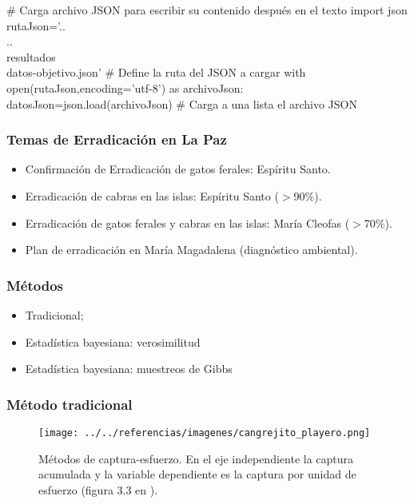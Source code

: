 \begin{pycode}
#  Carga archivo JSON para escribir su contenido después en el texto
import json
rutaJson='..\\..\\resultados\\datos-objetivo.json' # Define la ruta del JSON a cargar
with open(rutaJson,encoding='utf-8') as archivoJson:
      datosJson=json.load(archivoJson)  # Carga a una lista el archivo JSON
\end{pycode}
\begin{frame} %
\frametitle{Temas de Erradicaci\'on en La Paz} %
\begin{itemize} %
  \item Confirmaci\'on de Erradicaci\'on de gatos ferales: Esp\'iritu Santo. %
  \item Erradicaci\'on de cabras en las islas: Esp\'iritu Santo ($>$90\%).
  \item Erradicaci\'on de gatos ferales y cabras en las islas: Mar\'ia Cleofas
  ($>$70\%).
  \item Plan de erradicaci\'on en Mar\'ia Magadalena (diagn\'ostico ambiental).
\end{itemize}%
\end{frame} %
\begin{frame}
\frametitle{M\'etodos}
\begin{itemize}
  \item Tradicional; \pause %
  \item Estad\'istica bayesiana: verosimilitud \pause
  \item Estad\'istica bayesiana: muestreos de Gibbs\pause
\end{itemize}
\end{frame}
\begin{frame}
\frametitle{M\'etodo tradicional}
\begin{figure}[h] %
\centering %
\texttt{[image: ../../referencias/imagenes/cangrejito\_playero.png]} %
\caption{M\'etodos de captura-esfuerzo. En el eje
independiente la captura acumulada y la variable dependiente es la captura por
unidad de esfuerzo (figura 3.3 en \cite{krebs2012}).}%
\label{fproCap} %
\end{figure}%
\end{frame}
